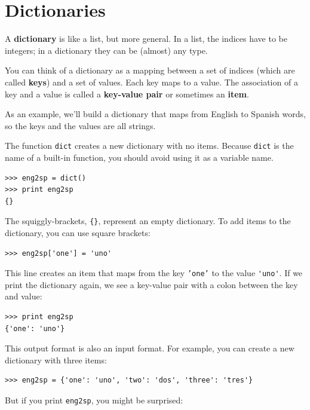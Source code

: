 \documentclass[10pt]{book}
\begin{document}
\chapter{Dictionaries}


A {\bf dictionary} is like a list, but more general.  In a list,
the indices have to be integers; in a dictionary they can
be (almost) any type.

You can think of a dictionary as a mapping between a set of indices
(which are called {\bf keys}) and a set of values.  Each key maps to a
value.  The association of a key and a value is called a {\bf
  key-value pair} or sometimes an {\bf item}.

As an example, we'll build a dictionary that maps from English
to Spanish words, so the keys and the values are all strings.

The function {\tt dict} creates a new dictionary with no items.
Because {\tt dict} is the name of a built-in function, you
should avoid using it as a variable name.


\beforeverb
\begin{verbatim}
>>> eng2sp = dict()
>>> print eng2sp
{}
\end{verbatim}
\afterverb

The squiggly-brackets, \verb"{}", represent an empty dictionary.
To add items to the dictionary, you can use square brackets:


\beforeverb
\begin{verbatim}
>>> eng2sp['one'] = 'uno'
\end{verbatim}
\afterverb
%
This line creates an item that maps from the key
{\tt 'one'} to the value \verb"'uno'".  If we print the
dictionary again, we see a key-value pair with a colon
between the key and value:

\beforeverb
\begin{verbatim}
>>> print eng2sp
{'one': 'uno'}
\end{verbatim}
\afterverb
%
This output format is also an input format.  For example,
you can create a new dictionary with three items:

\beforeverb
\begin{verbatim}
>>> eng2sp = {'one': 'uno', 'two': 'dos', 'three': 'tres'}
\end{verbatim}
\afterverb
%
But if you print {\tt eng2sp}, you might be surprised:
\end{document}
